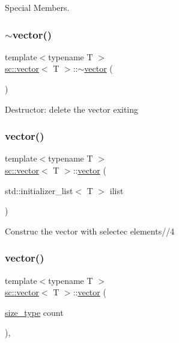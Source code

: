 Special Members. 

\mbox{\label{classsc_1_1vector_a024d736c8ec23f0bc187a4a0e59b2da5}} 
\subsubsection{\texorpdfstring{$\sim$vector()}{~vector()}}
{\footnotesize\ttfamily template$<$typename T $>$ \\
\hyperlink{classsc_1_1vector}{sc\+::vector}$<$ T $>$\+::$\sim$\hyperlink{classsc_1_1vector}{vector} (\begin{DoxyParamCaption}{ }\end{DoxyParamCaption})\hspace{0.3cm}{\ttfamily [inline]}}

Destructor\+: delete the vector exiting \mbox{\label{classsc_1_1vector_a431bb1411ec9a488b68b0eed9d8b5727}} 
\subsubsection{\texorpdfstring{vector()}{vector()}\hspace{0.1cm}{\footnotesize\ttfamily [2/5]}}
{\footnotesize\ttfamily template$<$typename T $>$ \\
\hyperlink{classsc_1_1vector}{sc\+::vector}$<$ T $>$\+::\hyperlink{classsc_1_1vector}{vector} (\begin{DoxyParamCaption}\item[{std\+::initializer\+\_\+list$<$ T $>$}]{ilist }\end{DoxyParamCaption})\hspace{0.3cm}{\ttfamily [inline]}}

Construc the vector with selectec elements//4 \mbox{\label{classsc_1_1vector_a641fcc38459aee8e3bdf86abb5f9d193}} 
\subsubsection{\texorpdfstring{vector()}{vector()}\hspace{0.1cm}{\footnotesize\ttfamily [3/5]}}
{\footnotesize\ttfamily template$<$typename T $>$ \\
\hyperlink{classsc_1_1vector}{sc\+::vector}$<$ T $>$\+::\hyperlink{classsc_1_1vector}{vector} (\begin{DoxyParamCaption}\item[{\hyperlink{classsc_1_1vector_a48bf37ba1a6d0c13504414d86e27c399}{size\+\_\+type}}]{count }\end{DoxyParamCaption})\hspace{0.3cm}{\ttfamily [inline]}, {\ttfamily [explicit]}}

